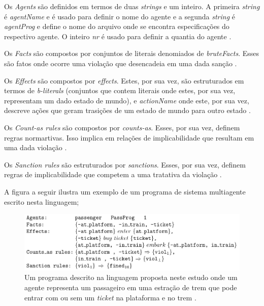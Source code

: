 \documentclass[12pt]{article}
\begin{document}
Os \textit{Agents} são definidos em termos de duas \textit{strings} e um inteiro. A primeira \textit{string} é \textit{agentName} e é usado para definir o nome do agente e a segunda \textit{string} é \textit{agentProg} e define o nome  do arquivo onde se encontra especificações do respectivo agente. O inteiro \textit{nr} é usado para definir a quantia do agente \cite{dastaniNormativeMultiAgentProgram}.

Os \textit{Facts} são compostos por conjuntos de literais denomiados de \textit{bruteFacts}. Esses são fatos onde ocorre uma violação que desencadeia em uma dada sanção \cite{dastaniNormativeMultiAgentProgram}. 

Os \textit{Effects} são compostos por \textit{effects}. Estes, por sua vez, são estruturados em termos de \textit{b-literals} (conjuntos que contem literais onde estes, por sua vez, representam um dado estado de mundo), e \textit{actionName} onde este, por sua vez, descreve ações que geram trasições de um estado de mundo para outro estado \cite{dastaniNormativeMultiAgentProgram}. 

Os \textit{Count-as rules} são compostos por \textit{counts-as}. Esses, por sua vez, definem regras normartivas. Isso implica em relações de implicabilidade que resultam em uma dada violação \cite{dastaniNormativeMultiAgentProgram}. 

Os \textit{Sanction rules} são estruturados por \textit{sanctions}. Esses, por sua vez, definem regras de implicabilidade que competem a uma tratativa da violação \cite{dastaniNormativeMultiAgentProgram}.
 
A figura a seguir ilustra um exemplo de um programa de sistema multiagente escrito nesta linguagem;


\begin{figure}[H]
  \centering
  \includegraphics[width=0.8\linewidth]{programdastani.png} 
  \caption{Um programa descrito na linguagem proposta neste estudo onde um agente representa um passageiro em uma estração de trem que pode entrar com ou sem um \textit{ticket} na plataforma e no trem \cite{dastaniNormativeMultiAgentProgram}.}
  \label{exemploprograma}
\end{figure}
\end{document}

